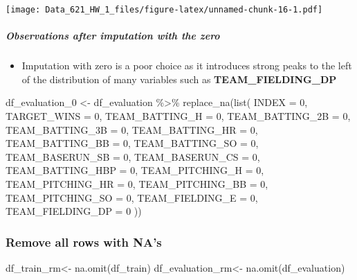 \documentclass[
]{article}
\newenvironment{Shaded}{\begin{snugshade}}{\end{snugshade}}
\newcommand{\AttributeTok}[1]{\textcolor[rgb]{0.77,0.63,0.00}{#1}}
\newcommand{\DecValTok}[1]{\textcolor[rgb]{0.00,0.00,0.81}{#1}}
\newcommand{\FunctionTok}[1]{\textcolor[rgb]{0.00,0.00,0.00}{#1}}
\newcommand{\NormalTok}[1]{#1}
\newcommand{\OtherTok}[1]{\textcolor[rgb]{0.56,0.35,0.01}{#1}}
\newcommand{\SpecialCharTok}[1]{\textcolor[rgb]{0.00,0.00,0.00}{#1}}
\providecommand{\tightlist}{%
  \setlength{\itemsep}{0pt}\setlength{\parskip}{0pt}}
\begin{document}
\texttt{[image: Data\_621\_HW\_1\_files/figure-latex/unnamed-chunk-16-1.pdf]}

\hypertarget{observations-after-imputation-with-the-zero}{%
\subparagraph{Observations after imputation with the
zero}\label{observations-after-imputation-with-the-zero}}

\begin{itemize}
\tightlist
\item
  Imputation with zero is a poor choice as it introduces strong peaks to
  the left of the distribution of many variables such as
  \textbf{TEAM\_FIELDING\_DP}
\end{itemize}

\begin{Shaded}
\begin{Highlighting}[]
\NormalTok{df\_evaluation\_0 }\OtherTok{\textless{}{-}}\NormalTok{ df\_evaluation }\SpecialCharTok{\%\textgreater{}\%}
  \FunctionTok{replace\_na}\NormalTok{(}\FunctionTok{list}\NormalTok{(}
    \AttributeTok{INDEX =} \DecValTok{0}\NormalTok{,}
    \AttributeTok{TARGET\_WINS =} \DecValTok{0}\NormalTok{,}
    \AttributeTok{TEAM\_BATTING\_H =} \DecValTok{0}\NormalTok{,}
    \AttributeTok{TEAM\_BATTING\_2B =} \DecValTok{0}\NormalTok{,}
    \AttributeTok{TEAM\_BATTING\_3B =} \DecValTok{0}\NormalTok{,}
    \AttributeTok{TEAM\_BATTING\_HR =} \DecValTok{0}\NormalTok{,}
    \AttributeTok{TEAM\_BATTING\_BB =} \DecValTok{0}\NormalTok{,}
    \AttributeTok{TEAM\_BATTING\_SO =} \DecValTok{0}\NormalTok{,}
    \AttributeTok{TEAM\_BASERUN\_SB =} \DecValTok{0}\NormalTok{,}
    \AttributeTok{TEAM\_BASERUN\_CS =} \DecValTok{0}\NormalTok{,}
    \AttributeTok{TEAM\_BATTING\_HBP =} \DecValTok{0}\NormalTok{,}
    \AttributeTok{TEAM\_PITCHING\_H =} \DecValTok{0}\NormalTok{,}
    \AttributeTok{TEAM\_PITCHING\_HR =} \DecValTok{0}\NormalTok{,}
    \AttributeTok{TEAM\_PITCHING\_BB =} \DecValTok{0}\NormalTok{,}
    \AttributeTok{TEAM\_PITCHING\_SO =} \DecValTok{0}\NormalTok{,}
    \AttributeTok{TEAM\_FIELDING\_E =} \DecValTok{0}\NormalTok{,}
    \AttributeTok{TEAM\_FIELDING\_DP =} \DecValTok{0}
\NormalTok{  ))}
\end{Highlighting}
\end{Shaded}

\hypertarget{remove-all-rows-with-nas}{%
\subsubsection{Remove all rows with
NA's}\label{remove-all-rows-with-nas}}

\begin{Shaded}
\begin{Highlighting}[]
\NormalTok{df\_train\_rm}\OtherTok{\textless{}{-}} \FunctionTok{na.omit}\NormalTok{(df\_train)}
\NormalTok{df\_evaluation\_rm}\OtherTok{\textless{}{-}} \FunctionTok{na.omit}\NormalTok{(df\_evaluation)}
\end{Highlighting}
\end{Shaded}
\end{document}
